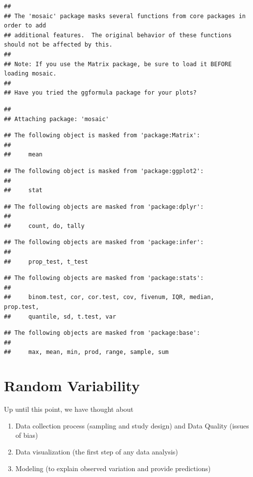 \documentclass[
]{book}
\providecommand{\tightlist}{%
  \setlength{\itemsep}{0pt}\setlength{\parskip}{0pt}}
\begin{document}
\begin{verbatim}
## 
## The 'mosaic' package masks several functions from core packages in order to add 
## additional features.  The original behavior of these functions should not be affected by this.
## 
## Note: If you use the Matrix package, be sure to load it BEFORE loading mosaic.
## 
## Have you tried the ggformula package for your plots?
\end{verbatim}

\begin{verbatim}
## 
## Attaching package: 'mosaic'
\end{verbatim}

\begin{verbatim}
## The following object is masked from 'package:Matrix':
## 
##     mean
\end{verbatim}

\begin{verbatim}
## The following object is masked from 'package:ggplot2':
## 
##     stat
\end{verbatim}

\begin{verbatim}
## The following objects are masked from 'package:dplyr':
## 
##     count, do, tally
\end{verbatim}

\begin{verbatim}
## The following objects are masked from 'package:infer':
## 
##     prop_test, t_test
\end{verbatim}

\begin{verbatim}
## The following objects are masked from 'package:stats':
## 
##     binom.test, cor, cor.test, cov, fivenum, IQR, median, prop.test,
##     quantile, sd, t.test, var
\end{verbatim}

\begin{verbatim}
## The following objects are masked from 'package:base':
## 
##     max, mean, min, prod, range, sample, sum
\end{verbatim}

\hypertarget{randvariability}{%
\chapter{Random Variability}\label{randvariability}}

Up until this point, we have thought about

\begin{enumerate}
\def\labelenumi{\arabic{enumi}.}
\tightlist
\item
  Data collection process (sampling and study design) and Data Quality (issues of bias)
\item
  Data visualization (the first step of any data analysis)
\item
  Modeling (to explain observed variation and provide predictions)
\end{enumerate}
\end{document}
